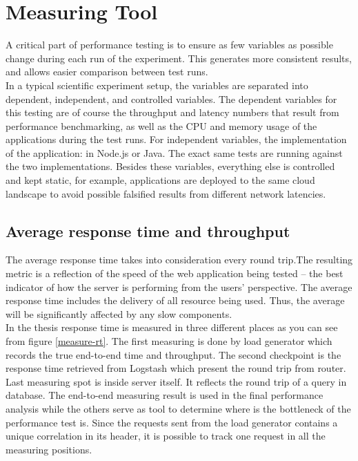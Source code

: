\chapter{Measuring Tool}
A critical part of performance testing is to ensure as few variables as possible change during each run of the experiment. This generates more consistent results, and allows easier comparison between test runs.\\
In a typical scientific experiment setup, the variables are separated into dependent, independent, and controlled variables. The dependent variables for this testing are of course the throughput and latency numbers that result from performance benchmarking, as well as the CPU and memory usage of the applications during the test runs. For independent variables, the implementation of the application: in Node.js or Java. The exact same tests are running against the two implementations. Besides these variables, everything else is controlled and kept static, for example, applications are deployed to the same cloud landscape to avoid possible falsified  results from different network latencies. \\


\section{Average response time and throughput}
The average response time takes into consideration every round trip.The resulting metric is a reflection of the speed of the web application being tested – the best indicator of how the server is performing from the users’ perspective. The average response time includes the delivery of all resource being used. Thus, the average will be significantly affected by any slow components.\\
In the thesis response time is measured in three different places as you can see from figure \ref{measure-rt}. The first measuring is done by load generator which records the true end-to-end time and throughput. The second checkpoint is the response time retrieved from Logstash which present the round trip from router. Last measuring spot is inside server itself. It reflects the round trip of a query in database. The end-to-end measuring result is used in the final performance analysis while the others serve as tool to determine where is the bottleneck of the performance test is. Since the requests sent from the load generator contains a unique correlation in its header, it is possible to track one request in all the measuring positions. \\

